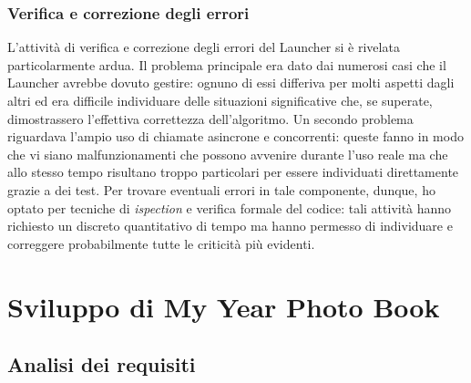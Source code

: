 			\subsubsection{Verifica e correzione degli errori}
				L'attività di verifica e correzione degli errori del Launcher si è rivelata particolarmente ardua. Il problema
				principale era dato dai numerosi casi che il Launcher avrebbe dovuto gestire: ognuno di essi differiva per molti
				aspetti dagli altri ed era difficile individuare delle situazioni significative che, se superate, dimostrassero
				l'effettiva correttezza dell'algoritmo. Un secondo problema riguardava l'ampio uso di chiamate asincrone e
				concorrenti: queste fanno in modo che vi siano malfunzionamenti che possono avvenire durante l'uso reale ma che allo
				stesso tempo risultano troppo particolari per essere individuati direttamente grazie a dei test.
				Per trovare eventuali errori in tale componente, dunque, ho optato per tecniche di \emph{ispection} e verifica
				formale del codice: tali attività hanno richiesto un discreto quantitativo di tempo ma hanno permesso di individuare
				e correggere probabilmente tutte le criticità più evidenti.
	\section{Sviluppo di My Year Photo Book}
		\subsection{Analisi dei requisiti}
